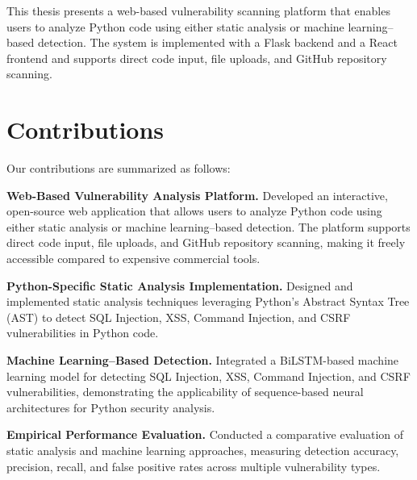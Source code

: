 This thesis presents a web-based vulnerability scanning platform that enables users to analyze Python code using either static analysis or machine learning--based detection. The system is implemented with a Flask backend and a React frontend and supports direct code input, file uploads, and GitHub repository scanning.

\newpage
\section{Contributions}
\label{sec:contributions}

Our contributions are summarized as follows:

\textbf{Web-Based Vulnerability Analysis Platform.}
Developed an interactive, open-source web application that allows users to analyze Python code using either static analysis or machine learning--based detection. The platform supports direct code input, file uploads, and GitHub repository scanning, making it freely accessible compared to expensive commercial tools.

\textbf{Python-Specific Static Analysis Implementation.}
Designed and implemented static analysis techniques leveraging Python's Abstract Syntax Tree (AST) to detect SQL Injection, XSS, Command Injection, and CSRF vulnerabilities in Python code.

\textbf{Machine Learning--Based Detection.}
Integrated a BiLSTM-based machine learning model for detecting SQL Injection, XSS, Command Injection, and CSRF vulnerabilities, demonstrating the applicability of sequence-based neural architectures for Python security analysis.

\textbf{Empirical Performance Evaluation.}
Conducted a comparative evaluation of static analysis and machine learning approaches, measuring detection accuracy, precision, recall, and false positive rates across multiple vulnerability types.

